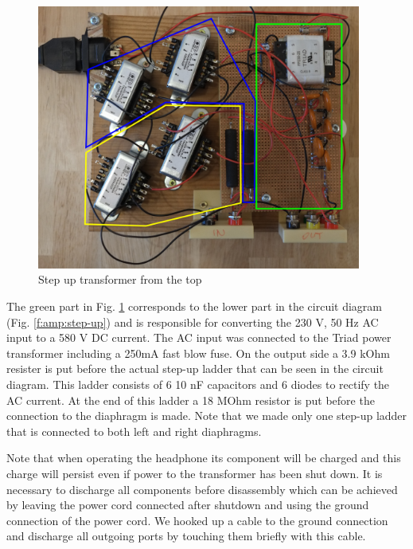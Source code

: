 \documentclass{article}
\begin{document}
\begin{figure}[htb]
    \centering
    \includegraphics[width=0.95\textwidth]{images/step-up-real-top.png}
    \caption{Step up transformer from the top}
    \label{f:amp:step-up-real}
\end{figure}

The green part in Fig. \ref{f:amp:step-up-real} corresponds to the lower part in the circuit diagram (Fig. \ref{f:amp:step-up}) and is responsible for converting the 230 V, 50 Hz AC input to a 580 V DC current. The AC input was connected to the Triad power transformer including a 250mA fast blow fuse. On the output side a 3.9 kOhm resister is put before the actual step-up ladder that can be seen in the circuit diagram. This ladder consists of 6 10 nF capacitors and 6 diodes to rectify the AC current. At the end of this ladder a 18 MOhm resistor is put before the connection to the diaphragm is made. Note that we made only one step-up ladder that is connected to both left and right diaphragms.

Note that when operating the headphone its component will be charged and this charge will persist even if power to the transformer has been shut down. It is necessary to discharge all components before disassembly which can be achieved by leaving the power cord connected after shutdown and using the ground connection of the power cord. We hooked up a cable to the ground connection and discharge all outgoing ports by touching them briefly with this cable.
\end{document}
